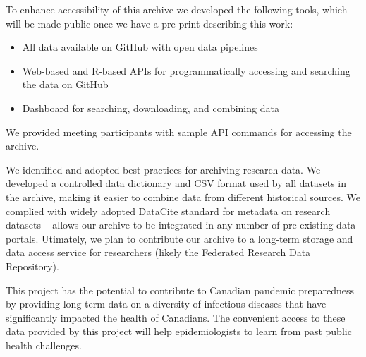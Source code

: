 To enhance accessibility of this archive we developed the following tools, which will be made public once we have a pre-print describing this work:

\begin{itemize}
  \item All data available on GitHub with open data pipelines
  \item Web-based and R-based APIs for programmatically accessing and searching the data on GitHub
  \item Dashboard for searching, downloading, and combining data
\end{itemize}

We provided meeting participants with sample API commands for accessing the archive.

We identified and adopted best-practices for archiving research data. We developed a controlled data dictionary and CSV format used by all datasets in the archive, making it easier to combine data from different historical sources. We complied with widely adopted DataCite standard for metadata on research datasets -- allows our archive to be integrated in any number of pre-existing data portals. Utimately, we plan to contribute our archive to a long-term storage and data access service for researchers (likely the Federated Research Data Repository).

This project has the potential to contribute to Canadian pandemic preparedness by providing long-term data on a diversity of infectious diseases that have significantly impacted the health of Canadians. The convenient access to these data provided by this project will help epidemiologists to learn from past public health challenges.